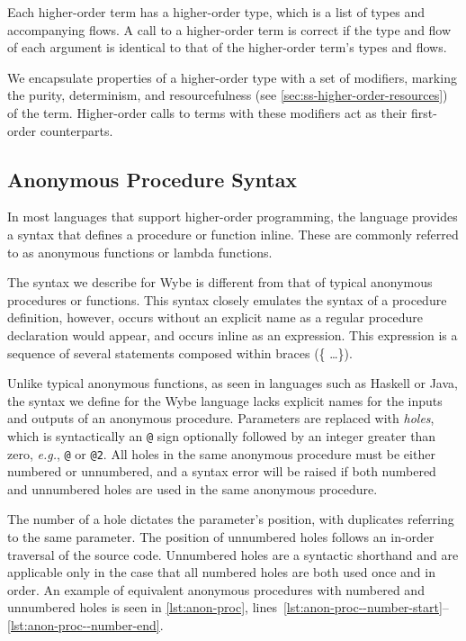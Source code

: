 Each higher-order term has a higher-order type, which is a list of types and accompanying flows. A call to a higher-order term is correct if the type and flow of each argument is identical to that of the higher-order term's types and flows. 

We encapsulate properties of a higher-order type with a set of modifiers, marking the purity, determinism, and resourcefulness (see \cref{sec:ss-higher-order-resources}) of the term. Higher-order calls to terms with these modifiers act as their first-order counterparts.

\subsection{Anonymous Procedure Syntax}
\label{ssec:anon-proc}

In most languages that support higher-order programming, the language provides a syntax that defines a procedure or function inline. These are commonly referred to as anonymous functions or lambda functions.

The syntax we describe for Wybe is different from that of typical anonymous procedures or functions. This syntax closely emulates the syntax of a procedure definition, however, occurs without an explicit name as a regular procedure declaration would appear, and occurs inline as an expression. This expression is a sequence of several statements composed within braces (\{ \dots \}).

Unlike typical anonymous functions, as seen in languages such as Haskell or Java, the syntax we define for the Wybe language lacks explicit names for the inputs and outputs of an anonymous procedure. Parameters are replaced with \textit{holes}, which is syntactically an \texttt{@} sign optionally followed by an integer greater than zero, \textit{e.g.}, \texttt{@} or \texttt{@2}. All holes in the same anonymous procedure must be either numbered or unnumbered, and a syntax error will be raised if both numbered and unnumbered holes are used in the same anonymous procedure. 

The number of a hole dictates the parameter's position, with duplicates referring to the same parameter. The position of unnumbered holes follows an in-order traversal of the source code. Unnumbered holes are a syntactic shorthand and are applicable only in the case that all numbered holes are both used once and in order. An example of equivalent anonymous procedures with numbered and unnumbered holes is seen in \cref{lst:anon-proc}, lines~\ref{lst:anon-proc--number-start}--\ref{lst:anon-proc--number-end}.

